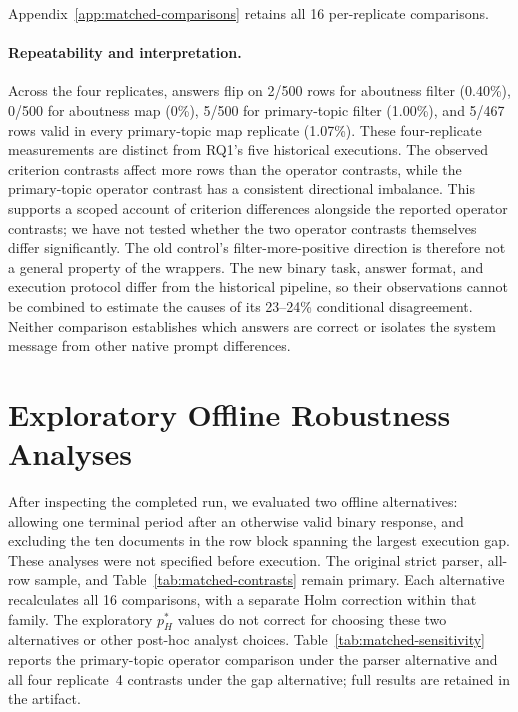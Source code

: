 \documentclass[11pt]{article}
\begin{document}
Appendix~\ref{app:matched-comparisons} retains all 16 per-replicate comparisons.

\paragraph{Repeatability and interpretation.}
Across the four replicates, answers flip on 2/500 rows for aboutness filter
(0.40\%), 0/500 for aboutness map (0\%), 5/500 for primary-topic filter
(1.00\%), and 5/467 rows valid in every primary-topic map replicate
(1.07\%). These four-replicate measurements are distinct from RQ1's five
historical executions. The observed criterion contrasts affect more rows
than the operator contrasts, while the primary-topic operator contrast has
a consistent directional imbalance. This supports a scoped account of
criterion differences alongside the reported operator contrasts;
we have not tested whether the two operator contrasts themselves differ
significantly. The old control's filter-more-positive direction is therefore
not a general property of the wrappers. The new binary task, answer format,
and execution protocol differ from the historical pipeline, so their
observations cannot be combined to estimate the causes of its 23--24\%
conditional disagreement. Neither comparison establishes which answers are
correct or isolates the system message from other native prompt differences.

\section{Exploratory Offline Robustness Analyses}
\label{sec:matched-sensitivity}

After inspecting the completed run, we evaluated two offline alternatives:
allowing one terminal period after an otherwise valid binary response, and
excluding the ten documents in the row block spanning the largest execution
gap. These analyses were not specified before execution. The original strict
parser, all-row sample, and Table~\ref{tab:matched-contrasts} remain primary.
Each alternative recalculates all 16 comparisons, with a separate Holm
correction within that family. The exploratory $p_H^*$ values do not correct
for choosing these two alternatives or other post-hoc analyst choices.
Table~\ref{tab:matched-sensitivity} reports the primary-topic operator
comparison under the parser alternative and all four replicate~4 contrasts
under the gap alternative; full results are retained in the artifact.
\end{document}
